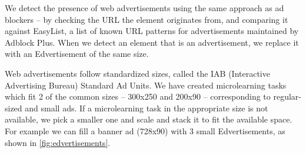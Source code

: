 \documentclass{sigchi}
\begin{document}
We detect the presence of web advertisements using the same approach as ad blockers -- by checking the URL the element originates from, and comparing it against EasyList, a list of known URL patterns for advertisements maintained by Adblock Plus. When we detect an element that is an advertisement, we replace it with an Edvertisement of the same size.

Web advertisements follow standardized sizes, called the IAB (Interactive Advertising Bureau) Standard Ad Units.
We have created microlearning tasks which fit 2 of the common sizes -- 300x250 and 200x90 -- corresponding to regular-sized and small ads.  If a microlearning task in the appropriate size is not available, we pick a smaller one and scale and stack it to fit the available space. For example we can fill a banner ad (728x90) with 3 small Edvertisements, as shown in \autoref{fig:edvertisements}. %




\end{document}

